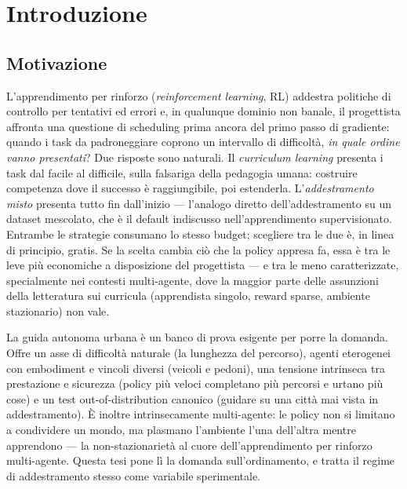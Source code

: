 \chapter{Introduzione}
\label{ch:intro}

\section{Motivazione}
\label{sec:motivation}

L'apprendimento per rinforzo (\emph{reinforcement learning}, RL) addestra
politiche di controllo per tentativi ed errori e, in qualunque dominio non
banale, il progettista affronta una questione di scheduling prima ancora
del primo passo di gradiente: quando i task da padroneggiare coprono un
intervallo di difficoltà, \emph{in quale ordine vanno presentati}? Due
risposte sono naturali. Il \emph{curriculum learning} presenta i task dal
facile al difficile, sulla falsariga della pedagogia umana: costruire
competenza dove il successo è raggiungibile, poi estenderla.
L'\emph{addestramento misto} presenta tutto fin dall'inizio --- l'analogo
diretto dell'addestramento su un dataset mescolato, che è il default
indiscusso nell'apprendimento supervisionato. Entrambe le strategie
consumano lo stesso budget; scegliere tra le due è, in linea di principio,
gratis. Se la scelta cambia ciò che la policy appresa fa, essa è tra le
leve più economiche a disposizione del progettista --- e tra le meno
caratterizzate, specialmente nei contesti multi-agente, dove la maggior
parte delle assunzioni della letteratura sui curricula (apprendista
singolo, reward sparse, ambiente stazionario) non vale.

La guida autonoma urbana è un banco di prova esigente per porre la
domanda. Offre un asse di difficoltà naturale (la lunghezza del
percorso), agenti eterogenei con embodiment e vincoli diversi (veicoli e
pedoni), una tensione intrinseca tra prestazione e sicurezza (policy più
veloci completano più percorsi e urtano più cose) e un test
out-of-distribution canonico (guidare su una città mai vista in
addestramento). È inoltre intrinsecamente multi-agente: le policy non si
limitano a condividere un mondo, ma plasmano l'ambiente l'una dell'altra
mentre apprendono --- la non-stazionarietà al cuore dell'apprendimento
per rinforzo multi-agente. Questa tesi pone lì la domanda
sull'ordinamento, e tratta il regime di addestramento stesso come
variabile sperimentale.

